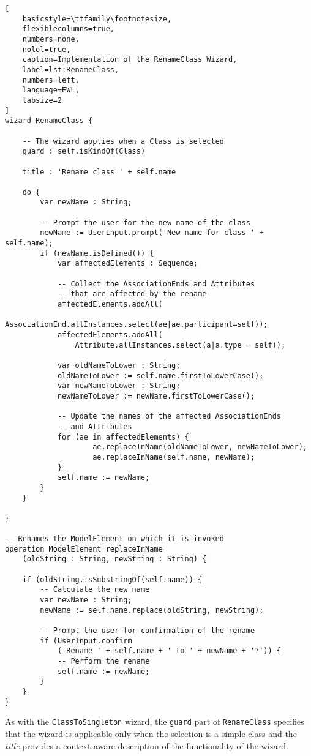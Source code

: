 \begin{lstlisting}[
	basicstyle=\ttfamily\footnotesize, 
	flexiblecolumns=true, 
	numbers=none, 
	nolol=true, 
	caption=Implementation of the RenameClass Wizard,
	label=lst:RenameClass, 
	numbers=left, 
	language=EWL, 
	tabsize=2
]
wizard RenameClass {
	
	-- The wizard applies when a Class is selected
	guard : self.isKindOf(Class)
	
	title : 'Rename class ' + self.name
	
	do {
		var newName : String;
		
		-- Prompt the user for the new name of the class
		newName := UserInput.prompt('New name for class ' + self.name);
		if (newName.isDefined()) {
			var affectedElements : Sequence;
			
			-- Collect the AssociationEnds and Attributes
			-- that are affected by the rename
			affectedElements.addAll(
				AssociationEnd.allInstances.select(ae|ae.participant=self));
			affectedElements.addAll(
				Attribute.allInstances.select(a|a.type = self));
			
			var oldNameToLower : String;
			oldNameToLower := self.name.firstToLowerCase();
			var newNameToLower : String;
			newNameToLower := newName.firstToLowerCase();
			
			-- Update the names of the affected AssociationEnds
			-- and Attributes
			for (ae in affectedElements) {
					ae.replaceInName(oldNameToLower, newNameToLower);
					ae.replaceInName(self.name, newName);
			}
			self.name := newName;
		}
	}
	
}

-- Renames the ModelElement on which it is invoked
operation ModelElement replaceInName
	(oldString : String, newString : String) {
	
	if (oldString.isSubstringOf(self.name)) {
		-- Calculate the new name
		var newName : String;
		newName := self.name.replace(oldString, newString);
		
		-- Prompt the user for confirmation of the rename
		if (UserInput.confirm
			('Rename ' + self.name + ' to ' + newName + '?')) {
			-- Perform the rename
			self.name := newName;
		}
	}
}
\end{lstlisting}
As with the \texttt{ClassToSingleton} wizard, the \texttt{guard} part of \texttt{RenameClass} specifies that the wizard is applicable only when the selection is a simple class and the \emph{title} provides a context-aware description of the functionality of the wizard. 

